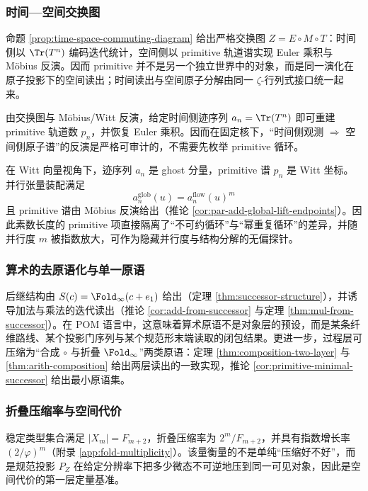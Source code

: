 \subsubsection{时间—空间交换图}\label{subsec:pom-time-space-diagram}
命题 \ref{prop:time-space-commuting-diagram} 给出严格交换图 $Z=E\circ M\circ T$：时间侧以 $\Tr(T^n)$ 编码迭代统计，空间侧以 primitive 轨道谱实现 Euler 乘积与 Möbius 反演。因而 primitive 并不是另一个独立世界中的对象，而是同一演化在原子投影下的空间读出；时间读出与空间原子分解由同一 $\zeta$-行列式接口统一起来。

\begin{remark}[时间迹重建空间原子谱]\label{rem:pom-trace-to-prime}
由交换图与 Möbius/Witt 反演，给定时间侧迹序列 $a_n=\Tr(T^n)$ 即可重建 primitive 轨道数 $p_n$，并恢复 Euler 乘积。因而在固定核下，“时间侧观测 $\Rightarrow$ 空间侧原子谱”的反演是严格可审计的，不需要先枚举 primitive 循环。
\end{remark}

\begin{remark}\label{rem:pom-witt-amplifier}
在 Witt 向量视角下，迹序列 $a_n$ 是 ghost 分量，primitive 谱 $p_n$ 是 Witt 坐标。并行张量装配满足
\[
a_n^{\mathrm{glob}}(u)=a_n^{\mathrm{flow}}(u)^m
\]
且 primitive 谱由 Möbius 反演给出（推论 \ref{cor:par-add-global-lift-endpoints}）。因此素数长度的 primitive 项直接隔离了“不可约循环”与“幂重复循环”的差异，并随并行度 $m$ 被指数放大，可作为隐藏并行度与结构分解的无偏探针。
\end{remark}

\subsubsection{算术的去原语化与单一原语}\label{subsec:pom-primitive-free}
后继结构由 $S(c)=\Fold_\infty(c+e_1)$ 给出（定理 \ref{thm:successor-structure}），并诱导加法与乘法的迭代读出（推论 \ref{cor:add-from-successor} 与定理 \ref{thm:mul-from-successor}）。在 POM 语言中，这意味着算术原语不是对象层的预设，而是某条纤维路线、某个投影门序列与某个规范形末端读取的闭包结果。更进一步，过程层可压缩为“合成 $\circ$ 与折叠 $\Fold_\infty$”两类原语：定理 \ref{thm:composition-two-layer} 与 \ref{thm:arith-composition} 给出两层读出的一致实现，推论 \ref{cor:primitive-minimal-successor} 给出最小原语集。

\subsubsection{折叠压缩率与空间代价}\label{subsec:pom-fold-compression}
稳定类型集合满足 $|X_m|=F_{m+2}$，折叠压缩率为 $2^m/F_{m+2}$，并具有指数增长率 $(2/\varphi)^m$（附录 \ref{app:fold-multiplicity}）。该量衡量的不是单纯“压缩好不好”，而是规范投影 \(P_Z\) 在给定分辨率下把多少微态不可逆地压到同一可见对象，因此是空间代价的第一层定量基准。

